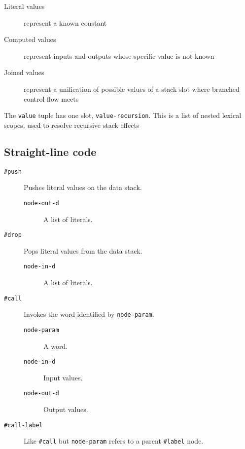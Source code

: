 \documentclass{book}
\begin{document}
\begin{description}
\item[Literal values] represent a known constant
\item[Computed values] represent inputs and outputs whose specific value is not known
\item[Joined values] represent a unification of possible values of a stack slot where branched control flow meets
\end{description}

The \verb|value| tuple has one slot, \verb|value-recursion|. This is a list of nested lexical scopes, used to resolve recursive stack effects

\subsection{Straight-line code}

\begin{description}

\item[\texttt{\#push}] Pushes literal values on the data stack.

\begin{description}
\item[\texttt{node-out-d}] A list of literals.
\end{description}

\item[\texttt{\#drop}] Pops literal values from the data stack.

\begin{description}
\item[\texttt{node-in-d}] A list of literals.
\end{description}

\item[\texttt{\#call}] Invokes the word identified by \verb|node-param|.

\begin{description}
\item[\texttt{node-param}]A word.\\
\item[\texttt{node-in-d}]Input values.\\
\item[\texttt{node-out-d}]Output values.
\end{description}

\item[\texttt{\#call-label}] Like \verb|#call| but \verb|node-param| refers to a parent \verb|#label| node.

\end{description}
\end{document}
